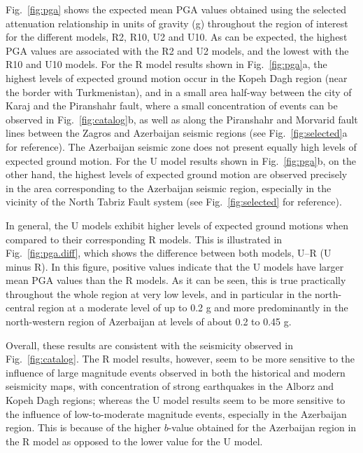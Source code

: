 Fig.~\ref{fig:pga} shows the expected mean PGA values obtained using the selected attenuation relationship in units of gravity (g) throughout the region of interest for the different models, R2, R10, U2 and U10. As can be expected, the highest PGA values are associated with the R2 and U2 models, and the lowest with the R10 and U10 models. For the R model results shown in Fig.~\ref{fig:pga}a, the highest levels of expected ground motion occur in the Kopeh Dagh region (near the border with Turkmenistan), and in a small area half-way between the city of Karaj and the Piranshahr fault, where a small concentration of events can be observed in Fig.~\ref{fig:catalog}b, as well as along the Piranshahr and Morvarid fault lines between the Zagros and Azerbaijan seismic regions (see Fig.~\ref{fig:selected}a for reference). The Azerbaijan seismic zone does not present equally high levels of expected ground motion. For the U model results shown in Fig.~\ref{fig:pga}b, on the other hand, the highest levels of expected ground motion are observed precisely in the area corresponding to the Azerbaijan seismic region, especially in the vicinity of the North Tabriz Fault system (see Fig.~\ref{fig:selected} for reference).

In general, the U models exhibit higher levels of expected ground motions when compared to their corresponding R models. This is illustrated in Fig.~\ref{fig:pga.diff}, which shows the difference between both models, U--R (U minus R). In this figure, positive values indicate that the U models have larger mean PGA values than the R models. As it can be seen, this is true practically throughout the whole region at very low levels, and in particular in the north-central region at a moderate level of up to 0.2 g and more predominantly in the north-western region of Azerbaijan at levels of about 0.2 to 0.45 g.

Overall, these results are consistent with the seismicity observed in Fig.~\ref{fig:catalog}. The R model results, however, seem to be more sensitive to the influence of large magnitude events observed in both the historical and modern seismicity maps, with concentration of strong earthquakes in the Alborz and Kopeh Dagh regions; whereas the U model results seem to be more sensitive to the influence of low-to-moderate magnitude events, especially in the Azerbaijan region. This is because of the higher $b$-value obtained for the Azerbaijan region in the R model as opposed to the lower value for the U model.

